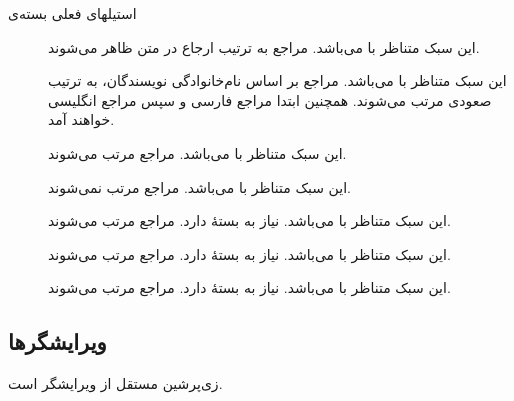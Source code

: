 \begin{plainslide}
\begin{block}{استیلهای فعلی بسته‌ی }
\small
\begin{description}
\item [] این سبک متناظر با  می‌باشد. مراجع به ترتیب ارجاع در متن ظاهر می‌شوند.
\item [] این سبک متناظر با  می‌باشد. مراجع بر اساس نام‌خانوادگی نویسندگان، به ترتیب صعودی مرتب می‌شوند.
 همچنین ابتدا مراجع فارسی و سپس مراجع انگلیسی خواهند آمد.
\item [] این سبک متناظر با  می‌باشد. مراجع مرتب می‌شوند.
\item [] این سبک متناظر با  می‌باشد. مراجع مرتب نمی‌شوند.
\item [] این سبک متناظر با  می‌باشد. نیاز به بستهٔ  دارد. مراجع مرتب می‌شوند.
\item [] این سبک متناظر با  می‌باشد. نیاز به بستهٔ  دارد. مراجع مرتب می‌شوند.
\item [] این سبک متناظر با  می‌باشد. نیاز به بستهٔ  دارد. مراجع مرتب می‌شوند.
\end{description}
\end{block}

\end{plainslide}

\begin{plainslide}
\vspace{-4.5cm}
\centering
{}
\end{plainslide}
\begin{plainslide}
\vspace{-4.5cm}
\centering
{}
\end{plainslide}

\subsection{ویرایشگرها}
\begin{plainslide}%
زی‌پرشین مستقل از ویرایشگر است.
{}
\begin{block}{\hfill{}}
\begin{latin}
\end{latin}
\end{block}
\end{plainslide}


